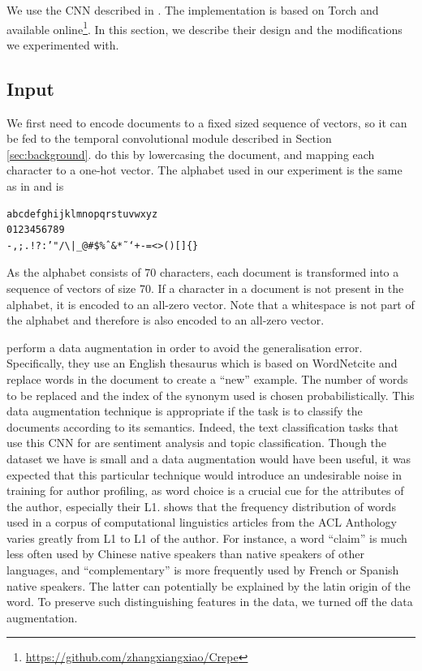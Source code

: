 We use the CNN described in \citep{zhang2015character}.
The implementation is based on Torch \citep{torch} and available online\footnote{\url{https://github.com/zhangxiangxiao/Crepe}}.
In this section, we describe their design and the modifications we experimented with.
\subsection{Input}
\label{sub:input}
We first need to encode documents to a fixed sized sequence of vectors, so it can be fed to the temporal convolutional module described in Section \ref{sec:background}.
\cite{zhang2015character} do this by lowercasing the document, and mapping each character to a one-hot vector.
The alphabet used in our experiment is the same as in \citep{zhang2015character} and is 
\begin{verbatim}
abcdefghijklmnopqrstuvwxyz
0123456789
-,;.!?:’"/\|_@#$%ˆ&*˜‘+-=<>()[]{}
\end{verbatim} 
As the alphabet consists of 70 characters, each document is transformed into a sequence of vectors of size 70.
If a character in a document is not present in the alphabet, it is encoded to an all-zero vector.
Note that a whitespace is not part of the alphabet and therefore is also encoded to an all-zero vector.

\cite{zhang2015character} perform a data augmentation in order to avoid the generalisation error.
Specifically, they use an English thesaurus which is based on WordNet\color{red}cite\color{black} and replace words in the document to create a ``new'' example.
The number of words to be replaced and the index of the synonym used is chosen probabilistically.
This data augmentation technique is appropriate if the task is to classify the documents according to its semantics.
Indeed, the text classification tasks that \cite{zhang2015character} use this CNN for are sentiment analysis and topic classification.
Though the dataset we have is small and a data augmentation would have been useful, it was expected that this particular technique would introduce an undesirable noise in training for author profiling, as word choice is a crucial cue for the attributes of the author, especially their L1.
\cite{yarowsky2013learning} shows that the frequency distribution of words used in a corpus of computational linguistics articles from the ACL Anthology varies greatly from L1 to L1 of the author.
For instance, a word ``claim'' is much less often used by Chinese native speakers than native speakers of other languages, and ``complementary'' is more frequently used by French or Spanish native speakers.
The latter can potentially be explained by the latin origin of the word.
To preserve such distinguishing features in the data, we turned off the data augmentation.

